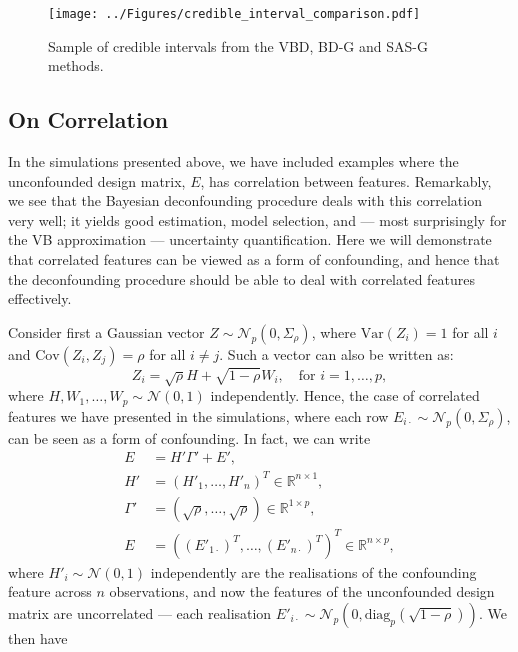 \documentclass[11pt]{article}
\newcommand{\R}{\mathbb{R}}
\newcommand{\N}{\mathcal{N}}
\newcommand{\diag}{\textrm{diag}}
\numberwithin{equation}{section}
\begin{document}
\begin{figure}[h]
\centering
  \texttt{[image: ../Figures/credible\_interval\_comparison.pdf]}
  \caption{Sample of credible intervals from the VBD, BD-G and SAS-G methods.}
  \label{fig:credible_interval_sample}
\end{figure}

\subsection{On Correlation}\label{sec:on_correlation}
In the simulations presented above, we have included examples where the unconfounded design matrix, $E$, has correlation between features. Remarkably, we see that the Bayesian deconfounding procedure deals with this correlation very well; it yields good estimation, model selection, and --- most surprisingly for the VB approximation --- uncertainty quantification. Here we will demonstrate that correlated features can be viewed as a form of confounding, and hence that the deconfounding procedure should be able to deal with correlated features effectively. 

Consider first a Gaussian vector $Z \sim \N_p(0, \Sigma_\rho)$, where $\textrm{Var}(Z_i) = 1$ for all $i$ and $\textrm{Cov}(Z_i, Z_j) = \rho$ for all $i \neq j$. Such a vector can also be written as:
$$
Z_i = \sqrt{\rho} H + \sqrt{1-\rho} W_i, \quad \textrm{for } i = 1,\dots,p,
$$
where $H, W_1, \dots, W_p \sim \N(0, 1)$ independently. Hence, the case of correlated features we have presented in the simulations, where each row $E_{i\cdot} \sim \N_p(0, \Sigma_\rho)$, can be seen as a form of confounding. In fact, we can write
\begin{align*}
E &= H'\Gamma' + E', \\
H' &= (H'_1, \dots, H'_n)^T \in \R^{n \times 1},\\
\Gamma' &= (\sqrt{\rho}, \dots, \sqrt{\rho})\in \R^{1 \times p},\\
E &= ((E'_{1\cdot})^T, \dots, (E'_{n\cdot})^T)^T \in \R^{n \times p},
\end{align*}
where $H'_i \sim \N(0, 1)$ independently are the realisations of the confounding feature across $n$ observations, and now the features of the unconfounded design matrix are uncorrelated --- each realisation $E'_{i\cdot} \sim \N_p(0, \diag_p(\sqrt{1-\rho}))$. We then have
\end{document}
